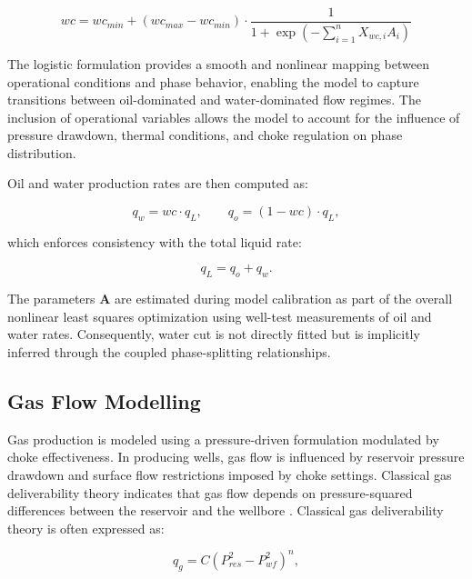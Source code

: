 \documentclass[12pt,APA]{uomthesis}
\begin{document}
\begin{equation}
wc = wc_{min} + (wc_{max} - wc_{min}) \cdot 
\frac{1}{1 + \exp\left(-\sum_{i=1}^{n} X_{wc,i} A_i\right)}
\end{equation}

The logistic formulation provides a smooth and nonlinear mapping between operational conditions and phase behavior, enabling the model to capture transitions between oil-dominated and water-dominated flow regimes. The inclusion of operational variables allows the model to account for the influence of pressure drawdown, thermal conditions, and choke regulation on phase distribution.

Oil and water production rates are then computed as:

\begin{equation}
q_w = wc \cdot q_L, \qquad q_o = (1 - wc) \cdot q_L,
\end{equation}

which enforces consistency with the total liquid rate:

\begin{equation}
q_L = q_o + q_w.
\end{equation}

The parameters $\mathbf{A}$ are estimated during model calibration as part of the overall nonlinear least squares optimization using well-test measurements of oil and water rates. Consequently, water cut is not directly fitted but is implicitly inferred through the coupled phase-splitting relationships.

\subsection{Gas Flow Modelling}
\label{subsec:gas_rate}
Gas production is modeled using a pressure-driven formulation modulated by choke effectiveness. In producing wells, gas flow is influenced by reservoir pressure drawdown and surface flow restrictions imposed by choke settings. Classical gas deliverability theory indicates that gas flow depends on pressure-squared differences between the reservoir and the wellbore \citep{ahmed2010reservoir, rawlins1935backpressure}. 
Classical gas deliverability theory is often expressed as:

\begin{equation}
q_g = C \left(P_{res}^2 - P_{wf}^2\right)^n,
\end{equation}

\end{document}
